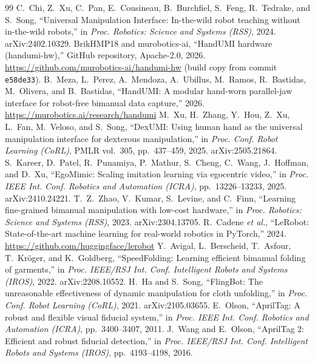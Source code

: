 \documentclass[conference,10pt]{IEEEtran}
\begin{document}
\begin{thebibliography}{99}
 C.~Chi, Z.~Xu, C.~Pan, E.~Cousineau, B.~Burchfiel, S.~Feng, R.~Tedrake, and S.~Song, ``Universal
Manipulation Interface: In-the-wild robot teaching without in-the-wild robots,'' in \emph{Proc. Robotics: Science and Systems
(RSS)}, 2024. arXiv:2402.10329.
 BrikHMP18 and murobotics-ai, ``HandUMI hardware (handumi-hw),'' GitHub repository, Apache-2.0, 2026.
\url{https://github.com/murobotics-ai/handumi-hw} (build copy from commit \texttt{e58de33}).
 B.~Meza, L.~Perez, A.~Mendoza, A.~Ubillus, M.~Ramos, R.~Bastidas, M.~Olivera, and B.~Bastidas,
``HandUMI: A modular hand-worn parallel-jaw interface for robot-free bimanual data capture,'' 2026.
\url{https://murobotics.ai/research/handumi}
 M.~Xu, H.~Zhang, Y.~Hou, Z.~Xu, L.~Fan, M.~Veloso, and S.~Song, ``DexUMI: Using human hand as the
universal manipulation interface for dexterous manipulation,'' in \emph{Proc. Conf. Robot Learning (CoRL)}, PMLR vol.~305,
pp.~437--459, 2025. arXiv:2505.21864.
 S.~Kareer, D.~Patel, R.~Punamiya, P.~Mathur, S.~Cheng, C.~Wang, J.~Hoffman, and D.~Xu,
``EgoMimic: Scaling imitation learning via egocentric video,'' in \emph{Proc. IEEE Int. Conf. Robotics and Automation
(ICRA)}, pp.~13226--13233, 2025. arXiv:2410.24221.
 T.~Z.~Zhao, V.~Kumar, S.~Levine, and C.~Finn, ``Learning fine-grained bimanual manipulation with
low-cost hardware,'' in \emph{Proc. Robotics: Science and Systems (RSS)}, 2023. arXiv:2304.13705.
 R.~Cadene \emph{et al.}, ``LeRobot: State-of-the-art machine learning for real-world robotics in
PyTorch,'' 2024. \url{https://github.com/huggingface/lerobot}
 Y.~Avigal, L.~Berscheid, T.~Asfour, T.~Kr\"oger, and K.~Goldberg, ``SpeedFolding: Learning
efficient bimanual folding of garments,'' in \emph{Proc. IEEE/RSJ Int. Conf. Intelligent Robots and Systems (IROS)}, 2022.
arXiv:2208.10552.
 H.~Ha and S.~Song, ``FlingBot: The unreasonable effectiveness of dynamic manipulation for cloth
unfolding,'' in \emph{Proc. Conf. Robot Learning (CoRL)}, 2021. arXiv:2105.03655.
 E.~Olson, ``AprilTag: A robust and flexible visual fiducial system,'' in \emph{Proc. IEEE Int.
Conf. Robotics and Automation (ICRA)}, pp.~3400--3407, 2011.
 J.~Wang and E.~Olson, ``AprilTag 2: Efficient and robust fiducial detection,'' in \emph{Proc.
IEEE/RSJ Int. Conf. Intelligent Robots and Systems (IROS)}, pp.~4193--4198, 2016.

\end{thebibliography}
\end{document}
